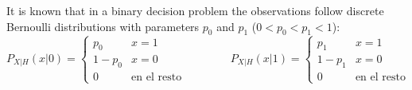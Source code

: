 \else

\question It is known that in a binary decision problem the observations follow discrete Bernoulli distributions with parameters $p_0$ and $p_1$ ($0 < p_0 < p_1 < 1$):
$$
P_{X|H}(x|0) = \left\{ \begin{array}{ll}  
					   p_0 & x=1 \\ 1-p_0 & x=0 \\0 & \mbox{en el resto}	
					   \end{array}  \right.
\qquad \qquad 
P_{X|H}(x|1) = \left\{ \begin{array}{ll}  
					   p_1 & x=1 \\ 1-p_1 & x=0 \\0 & \mbox{en el resto}
					   \end{array}  \right.
$$		    
					    
